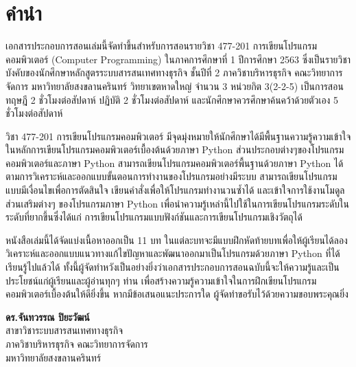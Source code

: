 \chapter{คำนำ}

เอกสารประกอบการสอนเล่มนี้จัดทำขึ้นสำหรับการสอนรายวิชา 477-201 การเขียนโปรแกรมคอมพิวเตอร์ (Computer Programming) ในภาคการศึกษาที่ 1 ปีการศึกษา 2563 ซึ่งเป็นรายวิชาบังคับของนักศึกษาหลักสูตรระบบสารสนเทศทางธุรกิจ ชั้นปีที่ 2 ภาควิชาบริหารธุรกิจ คณะวิทยาการจัดการ มหาวิทยาลัยสงขลานครินทร์ วิทยาเขตหาดใหญ่ จำนวน 3 หน่วยกิต 3(2-2-5) เป็นการสอนทฤษฎี 2 ชั่วโมงต่อสัปดาห์ ปฏิบัติ 2 ชั่วโมงต่อสัปดาห์ และนักศึกษาควรศึกษาค้นคว้าด้วยตัวเอง 5 ชั่วโมงต่อสัปดาห์

วิชา 477-201 การเขียนโปรแกรมคอมพิวเตอร์ มีจุดมุ่งหมายให้นักศึกษาได้มีพื้นฐานความรู้ความเข้าใจในหลักการเขียนโปรแกรมคอมพิวเตอร์เบื้องต้นด้วยภาษา Python ส่วนประกอบต่างๆของโปรแกรมคอมพิวเตอร์และภาษา Python สามารถเขียนโปรแกรมคอมพิวเตอร์พื้นฐานด้วยภาษา Python ได้ตามการวิเคราะห์และออกแบบขั้นตอนการทำงานของโปรแกรมอย่างมีระบบ สามารถเขียนโปรแกรมแบบมีเงื่อนไขเพื่อการตัดสินใจ เขียนคำสั่งเพื่อให้โปรแกรมทำงานวนซ้ำได้ และเข้าใจการใช้งานโมดูลส่วนเสริมต่างๆ ของโปรแกรมภาษา Python เพื่อนำความรู้เหล่านี้ไปใช้ในการเขียนโปรแกรมระดับในระดับที่ยากขึ้นซึ่งได้แก่ การเขียนโปรแกรมแบบฟังก์ชันและการเขียนโปรแกรมเชิงวัตถุได้

หนังสือเล่มนี้ได้จัดแบ่งเนื้อหาออกเป็น 11 บท ในแต่ละบทจะมีแบบฝึกหัดท้ายบทเพื่อให้ผู้เรียนได้ลองวิเคราะห์และออกแบบแนวทางแก้ไขปัญหาและพัฒนาออกมาเป็นโปรแกรมด้วยภาษา Python ที่ได้เรียนรู้ไปแล้วได้ ทั้งนี้ผู้จัดทำหวังเป็นอย่างยิ่งว่าเอกสารประกอบการสอนฉบับนี้จะให้ความรู้และเป็นประโยชน์แก่ผู้เรียนและผู้อ่านทุกๆ ท่าน เพื่อสร้างความรู้ความเข้าใจในการฝึกเขียนโปรแกรมคอมพิวเตอร์เบื้องต้นให้ดียิ่งขึ้น หากมีข้อเสนอแนะประการใด ผู้จัดทำขอรับไว้ด้วยความขอบพระคุณยิ่ง

\vspace{10mm}
\noindent
\textbf{ดร.จันทวรรณ ปิยะวัฒน์}\\
สาขาวิชาระบบสารสนเทศทางธุรกิจ\\
ภาควิชาบริหารธุรกิจ คณะวิทยาการจัดการ\\
มหาวิทยาลัยสงขลานครินทร์